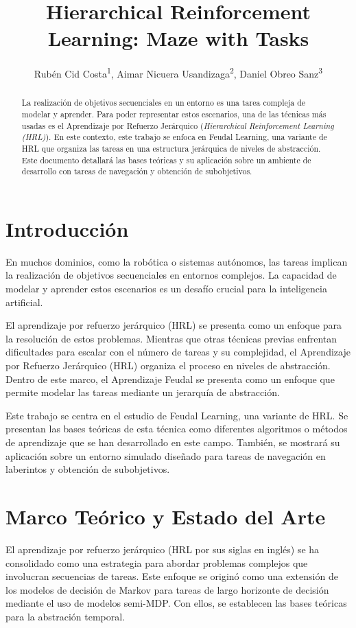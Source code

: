 \documentclass[letterpaper]{article} %
\title{Hierarchical Reinforcement Learning: Maze with Tasks}
\author {
    Rubén Cid Costa\textsuperscript{\rm 1},
    Aimar Nicuera Usandizaga\textsuperscript{\rm 2},
    Daniel Obreo Sanz\textsuperscript{\rm 3}
}
\begin{document}
\maketitle

\begin{abstract}
La realización de objetivos secuenciales en un entorno es una tarea compleja de modelar y aprender. Para poder representar estos
escenarios, una de las técnicas más usadas es el Aprendizaje por Refuerzo Jerárquico (\textit{Hierarchical Reinforcement Learning (HRL)}).
En este contexto, este trabajo se enfoca en Feudal Learning, una variante de HRL que organiza las tareas en una estructura jerárquica de
niveles de abstracción. Este documento detallará las bases teóricas y su aplicación sobre un ambiente de desarrollo con tareas de navegación y
obtención de subobjetivos.
\end{abstract}

\section{Introducción}

En muchos dominios, como la robótica o sistemas autónomos, las tareas implican la realización de objetivos secuenciales en entornos complejos.
La capacidad de modelar y aprender estos escenarios es un desafío crucial para la inteligencia artificial.


El aprendizaje por refuerzo jerárquico (HRL) se presenta como un enfoque para la resolución de estos problemas. Mientras que otras técnicas previas
enfrentan dificultades para escalar con el número de tareas y su complejidad, el Aprendizaje por Refuerzo Jerárquico (HRL) organiza el proceso en 
niveles de abstracción. Dentro de este marco, el Aprendizaje Feudal se presenta como un enfoque que permite modelar las tareas mediante un jerarquía
de abstracción.


Este trabajo se centra en el estudio de Feudal Learning, una variante de HRL. Se presentan las bases teóricas de esta técnica como diferentes algoritmos
o métodos de aprendizaje que se han desarrollado en este campo. También, se mostrará su aplicación sobre un entorno simulado diseñado para tareas 
de navegación en laberintos y obtención de subobjetivos. 

\section{Marco Teórico y Estado del Arte}
El aprendizaje por refuerzo jerárquico (HRL por sus siglas en inglés) se ha consolidado como una estrategia para abordar problemas complejos
que involucran secuencias de tareas. Este enfoque se originó como una extensión de los modelos de decisión de Markov para tareas de largo horizonte
de decisión mediante el uso de modelos semi-MDP\cite{sutton1999between}. Con ellos, se establecen las bases teóricas para la abstración temporal.
\end{document}
